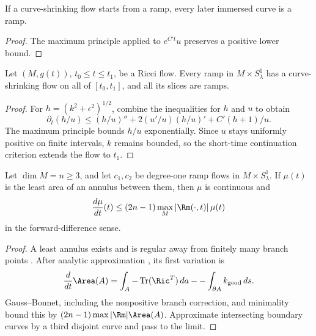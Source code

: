 \begin{corollary}
\label{cor:ramp-preserved-under-flow}
\label{ubd}
If a curve-shrinking flow starts from a ramp, every later immersed curve is a
ramp.
\end{corollary}
\begin{proof}
\sketch The maximum principle applied to $e^{C't}u$ preserves a positive lower bound.
\end{proof}

\begin{lemma}
\label{lem:curve-shrinking-exists-for-ramps}
\label{csforramps}
Let $(M,g(t))$, $t_0\le t\le t_1$, be a Ricci flow. Every ramp in
$M\times S^1_\lambda$ has a curve-shrinking flow on all of $[t_0,t_1]$, and
all its slices are ramps.
\end{lemma}
\begin{proof}
\sketch {}
For $h=(k^2+\epsilon^2)^{1/2}$, combine the inequalities for $h$ and $u$ to
obtain
\[
\partial_t(h/u)\le(h/u)''+2(u'/u)(h/u)'+C'(h+1)/u.
\]
The maximum principle bounds $h/u$ exponentially. Since $u$ stays uniformly
positive on finite intervals, $k$ remains bounded, so the short-time
continuation criterion extends the flow to $t_1$.
\end{proof}

\begin{lemma}
\label{lem:minimal-annulus-area-growth}
\label{mugrowth}
Let $\dim M=n\ge3$, and let $c_1,c_2$ be degree-one ramp flows in
$M\times S^1_\lambda$. If $\mu(t)$ is the least area of an annulus between
them, then $\mu$ is continuous and
\[
\frac{d\mu}{dt}(t)\le(2n-1)\max_M|\Rm(\cdot,t)|\,\mu(t)
\]
in the forward-difference sense.
\end{lemma}
\begin{proof}
\sketch A least annulus exists and is regular away from finitely many branch
points \cite{Hildebrandt,Morrey}. After analytic approximation
\cite{Bando,GageHamilton}, its first variation is
\[
\frac d{dt}\Area(A)=\int_A-\operatorname{Tr}(\Ric^T)\,da
--\int_{\partial A}k_{\mathrm{geod}}\,ds.
\]
Gauss--Bonnet, including the nonpositive branch correction, and minimality
bound this by $(2n-1)\max|\Rm|\Area(A)$. Approximate intersecting boundary
curves by a third disjoint curve and pass to the limit.
\end{proof}

